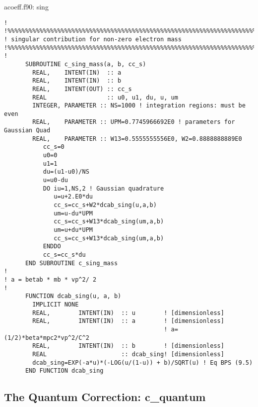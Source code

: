 \documentclass[preprint,12pt,eqsecnum,nofootinbib,amsmath,amssymb]{revtex4}
\begin{document}
{{\vskip0.5cm 
\noindent
acoeff.f90: sing
{
\baselineskip 10pt
\begin{verbatim}
!
!%%%%%%%%%%%%%%%%%%%%%%%%%%%%%%%%%%%%%%%%%%%%%%%%%%%%%%%%%%%%%%%%%%%%%%%
! singular contribution for non-zero electron mass
!%%%%%%%%%%%%%%%%%%%%%%%%%%%%%%%%%%%%%%%%%%%%%%%%%%%%%%%%%%%%%%%%%%%%%%%
!
      SUBROUTINE c_sing_mass(a, b, cc_s)
        REAL,    INTENT(IN)  :: a
        REAL,    INTENT(IN)  :: b
        REAL,    INTENT(OUT) :: cc_s
        REAL                 :: u0, u1, du, u, um
        INTEGER, PARAMETER :: NS=1000 ! integration regions: must be even
        REAL,    PARAMETER :: UPM=0.7745966692E0 ! parameters for Gaussian Quad
        REAL,    PARAMETER :: W13=0.5555555556E0, W2=0.8888888889E0
           cc_s=0
           u0=0
           u1=1
           du=(u1-u0)/NS
           u=u0-du
           DO iu=1,NS,2 ! Gaussian quadrature
              u=u+2.E0*du
              cc_s=cc_s+W2*dcab_sing(u,a,b)
              um=u-du*UPM
              cc_s=cc_s+W13*dcab_sing(um,a,b)
              um=u+du*UPM
              cc_s=cc_s+W13*dcab_sing(um,a,b)
           ENDDO
           cc_s=cc_s*du
      END SUBROUTINE c_sing_mass
!
! a = betab * mb * vp^2/ 2
!      
      FUNCTION dcab_sing(u, a, b)
        IMPLICIT NONE
        REAL,        INTENT(IN)  :: u        ! [dimensionless]
        REAL,        INTENT(IN)  :: a        ! [dimensionless] 
                                             ! a=(1/2)*beta*mpc2*vp^2/C^2
        REAL,        INTENT(IN)  :: b        ! [dimensionless]
        REAL                     :: dcab_sing! [dimensionless]
        dcab_sing=EXP(-a*u)*(-LOG(u/(1-u)) + b)/SQRT(u) ! Eq BPS (9.5)
      END FUNCTION dcab_sing
\end{verbatim}
}


\subsection{The Quantum Correction: c\_quantum}

}}
\end{document}
